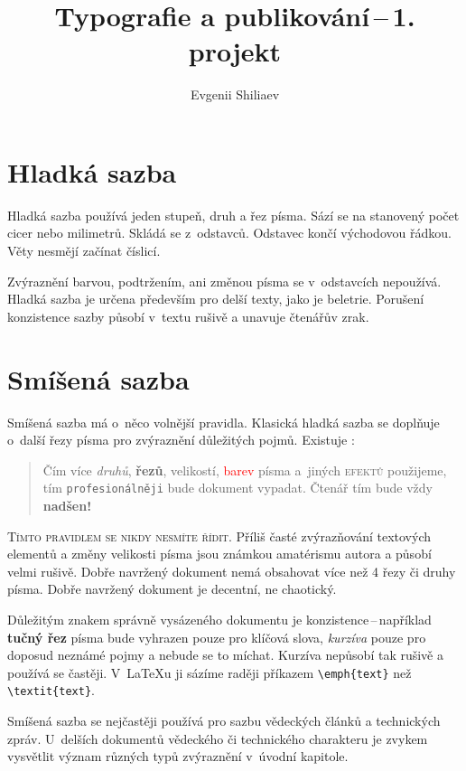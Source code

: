 \documentclass[a4paper, twocolumn, 10pt]{article}
\title{Typografie a publikování\,--\,1. projekt}
\author{Evgenii Shiliaev \\ \email{xshili00@stud.fit.vutbr.cz} }
\date{}
\begin{document}
\maketitle

\section{Hladká sazba}
Hladká sazba používá jeden stupeň, druh a řez písma.
Sází se na stanovený počet cicer nebo milimetrů.
Skládá se z~odstavců. Odstavec končí východovou řádkou.
Věty nesmějí začínat číslicí.

Zvýraznění barvou, podtržením, ani změnou písma se v~odstavcích nepoužívá.
Hladká sazba je určena především pro delší texty, jako je beletrie.
Porušení konzistence sazby působí v~textu rušivě a unavuje čtenářův zrak.

\section{Smíšená sazba}\label{sec:smisena_sazba}
Smíšená sazba má o~něco volnější pravidla.
Klasická hladká sazba se doplňuje o~další řezy písma pro zvýraznění důležitých pojmů.
Existuje :

\begin{quotation}
	Čím více \emph{druhů}, \textbf{řezů}, {\tiny velikostí}, \textcolor{red}{barev} písma a~jiných \textsc{efektů} použijeme, tím  \texttt{profesionálněji} bude {\selectfont \Large{dokument}} vypadat.
		{\Huge Č}{\huge t}{\LARGE e}{\Large n}{\normalsize á}{\small ř} {\footnotesize t}{\scriptsize í}{\tiny m} bude vždy {\Huge \textbf{nadšen!}}
\end{quotation}

\textsc{Tímto pravidlem se nikdy nesmíte řídit.}
Příliš časté zvýrazňování textových elementů a změny velikosti písma jsou známkou amatérismu autora a působí velmi rušivě.
Dobře navržený dokument nemá obsahovat více než 4 řezy či druhy písma.
Dobře navržený dokument je decentní, ne chaotický.

Důležitým znakem správně vysázeného dokumentu je konzistence\,--\,například \textbf{tučný řez} písma bude vyhrazen pouze pro klíčová slova, \emph{kurzíva} pouze pro doposud neznámé pojmy a nebude se to míchat.
Kurzíva nepůsobí tak rušivě a používá se častěji.
V~\LaTeX u ji sázíme raději příkazem \verb|\emph{text}| než \verb|\textit{text}|.

Smíšená sazba se nejčastěji používá pro sazbu vědeckých článků a technických zpráv.
U~delších dokumentů vědeckého či technického charakteru je zvykem vysvětlit význam různých typů zvýraznění v~úvodní kapitole.
\end{document}
